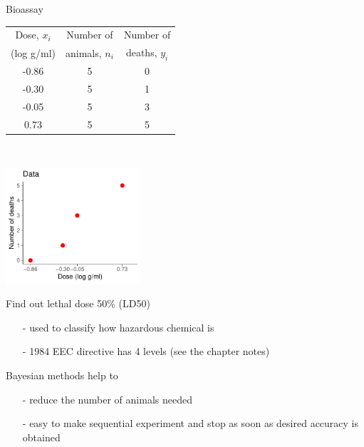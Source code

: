 \documentclass[finnish,english,t]{beamer}
\begin{document}
\begin{frame}{Bioassay}

{\footnotesize\vspace{-1mm}
    \begin{tabular}{c c c}
      \vspace{-1mm} Dose, $x_i$ & Number of & Number of \\
      (log g/ml) & animals, $n_i$ & deaths, $y_i$ \\
      \hline \vspace{-1mm}
      -0.86 & 5 & \color{red} 0 \\ \vspace{-1mm}
      -0.30 & 5 & \color{red} 1 \\ \vspace{-1mm}
      -0.05 & 5 & \color{red} 3 \\ \vspace{-1mm}
       0.73 & 5 & \color{red} 5
    \end{tabular}
  }~\parbox[t][3cm][b]{3.5cm}{\includegraphics[width=5cm]{bioassay_data_small.pdf}}
  \vspace{2mm}
  \pause

  \vspace{-\baselineskip}
  Find out lethal dose 50\% (LD50)
    \begin{itemize}
      \item[-] used to classify how hazardous chemical is
      \item[-] 1984 EEC directive has 4 levels (see the chapter notes)
      \end{itemize}
      
  \pause
   Bayesian methods help to
    \begin{itemize}
    \item[-] reduce the number of animals needed
    \item[-] easy to make sequential experiment and stop as soon as
      desired accuracy is obtained
    \end{itemize}

\end{frame}
\end{document}
